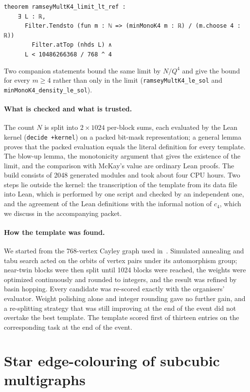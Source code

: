 \documentclass[11pt,a4paper]{article}
\newcommand{\lean}[1]{\texttt{#1}}
\theoremstyle{remark}
\begin{document}
\begin{lstlisting}
theorem ramseyMultK4_limit_lt_ref :
    ∃ L : ℝ,
      Filter.Tendsto (fun m : ℕ => (minMonoK4 m : ℝ) / (m.choose 4 : ℝ))
        Filter.atTop (nhds L) ∧
      L < 10486266368 / 768 ^ 4
\end{lstlisting}

\noindent Two companion statements bound the same limit by $N/Q^4$ and give the bound for every $m\ge4$ rather
than only in the limit (\lean{ramseyMultK4\_le\_sol} and \lean{minMonoK4\_density\_le\_sol}).

\paragraph{What is checked and what is trusted.}
The count $N$ is split into $2\times1024$ per-block sums, each evaluated by the Lean kernel (\lean{decide +kernel}) on
a packed bit-mask representation; a general lemma proves that the packed evaluation equals the literal definition for
every template. The blow-up lemma, the monotonicity argument that gives the existence of the limit, and the
comparison with McKay's value are ordinary Lean proofs. The build consists of 2048 generated modules and took about
four CPU hours. Two steps lie outside the kernel: the transcription of the template from its data file into Lean,
which is performed by one script and checked by an independent one, and the agreement of the Lean definitions with
the informal notion of $c_4$, which we discuss in the accompanying packet.

\paragraph{How the template was found.}
We started from the 768-vertex Cayley graph used in~\cite{ppss}. Simulated annealing and tabu search acted on the
orbits of vertex pairs under its automorphism group; near-twin blocks were then split until 1024 blocks were reached,
the weights were optimized continuously and rounded to integers, and the result was refined by basin hopping. Every
candidate was re-scored exactly with the organisers' evaluator. Weight polishing alone and integer rounding gave no
further gain, and a re-splitting strategy that was still improving at the end of the event did not overtake the
best template. The template scored first of thirteen entries on the corresponding task at the end of the event.

\section{Star edge-colouring of subcubic multigraphs}\label{sec:dms}
\end{document}
